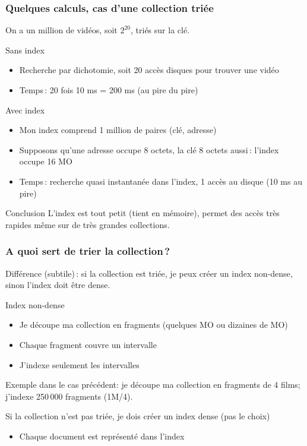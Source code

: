 \begin{frame}
\frametitle{Quelques calculs, cas d'une collection triée}

On a un million de vidéos, soit $2^{20}$, \alert{triés} sur la clé.

\vfill

\alert{Sans index}
\begin{itemize}
  \item Recherche par dichotomie, soit 20 accès disques pour trouver une vidéo
  \item Temps\,: 20 fois 10 ms = 200 ms (au pire du pire)
\end{itemize} 

\alert{Avec index}
\begin{itemize}
  \item Mon index comprend 1 million de paires (clé, adresse)
  \item Supposons qu'une adresse occupe 8 octets, la clé 8 octets aussi\,: l'index occupe 16 MO 
  \item Temps\,: recherche quasi instantanée dans l'index, 1 accès au disque (10 ms au pire) 
\end{itemize} 

\begin{noteblock}{Conclusion}
L'index est tout petit (tient en mémoire), permet des accès très rapides même sur de très grandes collections.
\end{noteblock}
\end{frame}


\begin{frame}
\frametitle{A quoi sert de \alert{trier} la collection\,?}

Différence (subtile)\,: si la collection est triée, je peux créer
un \alert{index non-dense}, sinon l'index \alert{doit} être dense.

\vfill
\alert{Index non-dense}

\begin{itemize}
  \item Je découpe ma collection en \alert{fragments} (quelques MO ou dizaines de MO)
  \item Chaque fragment couvre un intervalle
  \item \alert{J'indexe seulement les intervalles}
\end{itemize} 

Exemple dans le cas précédent: je découpe ma collection en fragments de 4 films; j'indexe
250\,000 fragments (1M/4).

\vfill

\alert{Si la collection n'est pas triée, je dois créer un index dense} (pas le choix)
\begin{itemize}
  \item Chaque document est représenté dans l'index
\end{itemize} 

\end{frame}

